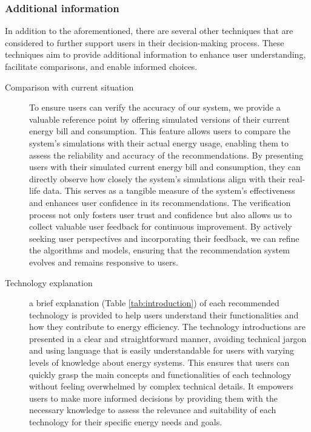 \subsubsection{Additional information}

In addition to the aforementioned, there are several other techniques that are considered to further support users in their decision-making process. 
These techniques aim to provide additional information to enhance user understanding, facilitate comparisons, and enable informed choices. 
\begin{description}
  \item[Comparison with current situation] To ensure users can verify the accuracy of our system, we provide a valuable reference point by offering simulated versions of their current energy bill and consumption. 
    This feature allows users to compare the system's simulations with their actual energy usage, enabling them to assess the reliability and accuracy of the recommendations. 
    By presenting users with their simulated current energy bill and consumption, they can directly observe how closely the system's simulations align with their real-life data. 
    This serves as a tangible measure of the system's effectiveness and enhances user confidence in its recommendations. 
    The verification process not only fosters user trust and confidence but also allows us to collect valuable user feedback for continuous improvement.
    By actively seeking user perspectives and incorporating their feedback, we can refine the algorithms and models, ensuring that the recommendation system evolves and remains responsive to users. 
  \item[Technology explanation] a brief explanation (Table \ref{tab:introduction}) of each recommended technology is provided to help users understand their functionalities and how they contribute to energy efficiency. 
    The technology introductions are presented in a clear and straightforward manner, avoiding technical jargon and using language that is easily understandable for users with varying levels of knowledge about energy systems. This ensures that users can quickly grasp the main concepts and functionalities of each technology without feeling overwhelmed by complex technical details.
    It empowers users to make more informed decisions by providing them with the necessary knowledge to assess the relevance and suitability of each technology for their specific energy needs and goals.
    \begin{center}
      \begin{table}[h!]

\end{table}
\end{center}
\end{description}
